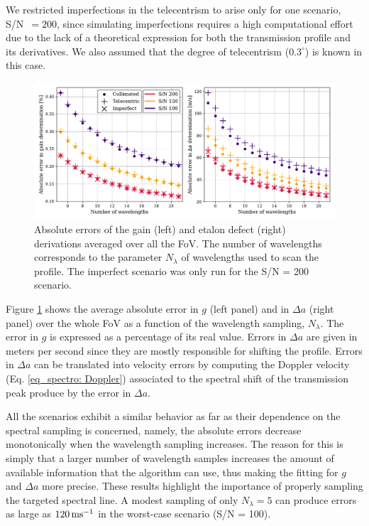 We restricted imperfections in the telecentrism to arise only for one scenario, S/N~$=200$, since simulating imperfections requires a high computational effort due to the lack of a theoretical expression for both the transmission profile and its derivatives. We also assumed that the degree of telecentrism ($0.3 ^\circ $) is known in this case.

\begin{figure}
    \centering
     \includegraphics[width=\textwidth]{figures/EtalonPaper/SNR_plot_imperfect.pdf}
    \caption[Errors in etalon parameters derivation.]{Absolute errors of the gain (left) and etalon defect (right) derivations averaged over all the FoV. The number of wavelengths corresponds to the parameter $N_\lambda$ of wavelengths used to scan the profile. The imperfect scenario was only run for the S/N = 200 scenario. \label{fig_etalon_corr:SNR_both}}
\end{figure}

Figure \ref{fig_etalon_corr:SNR_both} shows the average absolute error in $g$ (left panel) and in $\Delta a$ (right panel) over the whole FoV as a function of the wavelength sampling, $N_\lambda$. The error in $g$ is expressed as a percentage of its real value. Errors in $\Delta a$ are given in meters per second since they are mostly responsible for shifting the profile. Errors in $\Delta a$ can be translated into velocity errors by computing the Doppler velocity (Eq. \ref{eq_spectro: Doppler}) associated to the spectral shift of the transmission peak produce by the error in $\Delta a$.

All the scenarios exhibit a similar behavior as far as their dependence on the spectral sampling is concerned, namely, the absolute errors decrease monotonically when the wavelength sampling increases. The reason for this is simply that a larger number of wavelength samples increases the amount of available information that the algorithm can use, thus making the fitting for $g$ and $\Delta a$ more precise. These results highlight the importance of properly sampling the targeted spectral line. A modest sampling of only $N_\lambda=5$ can produce errors as large as $120 \, {\rm ms^{-1}}$ in the worst-case scenario (S/N = 100). 

